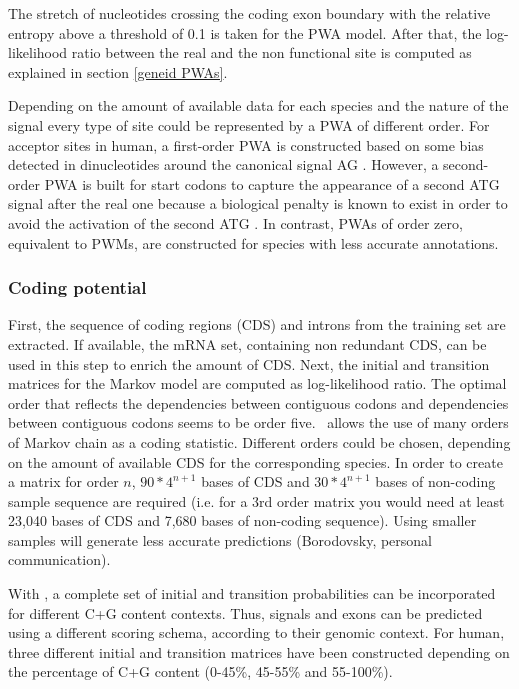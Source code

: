 The stretch of nucleotides crossing the coding exon boundary with the
relative entropy above a threshold of 0.1 is taken for the PWA
model. After that, the log-likelihood ratio between the real and the
non functional site is computed as explained in section \ref{geneid PWAs}.

Depending on the amount of available data for each species and the
nature of the signal every type of site could be represented by a
PWA of different order. For acceptor sites in human, a first-order PWA
is constructed based on some bias detected in dinucleotides around the
canonical signal AG \citep{burge:1997a}. However, a second-order PWA is
built for start codons to capture the appearance of a second ATG
signal after the real one because a biological penalty is known to
exist in order to avoid the activation of the second ATG
\citep{kozak:1999a}. In contrast, PWAs of order zero, equivalent to 
PWMs, are constructed for species with less accurate annotations.


\subsubsection{Coding potential}
\label{coding}
First, the sequence of coding regions (CDS) and introns from the
training set are extracted. If available, the mRNA set, containing non
redundant CDS, can be used in this step to enrich the amount of
CDS. Next, the initial and transition matrices for the Markov model
are computed as log-likelihood ratio. The optimal order that reflects
the dependencies between contiguous codons and dependencies between
contiguous codons seems to be order five. \geneid\ allows the use of
many orders of Markov chain as a coding statistic.  Different orders
could be chosen, depending on the amount of available CDS for the
corresponding species. In order to create a matrix for order $n$,
$90*4^{n+1}$ bases of CDS and $30*4^{n+1}$ bases of non-coding sample
sequence are required (i.e. for a 3rd order matrix you would need at
least 23,040 bases of CDS and 7,680 bases of non-coding
sequence). Using smaller samples will generate less accurate
predictions (Borodovsky, personal communication).

With \geneid, a complete set of initial and transition probabilities
can be incorporated for different C+G content contexts. Thus, signals
and exons can be predicted using a different scoring schema, according
to their genomic context.  For human, three different initial and
transition matrices have been constructed depending on the percentage
of C+G content (0-45\%, 45-55\% and 55-100\%).

